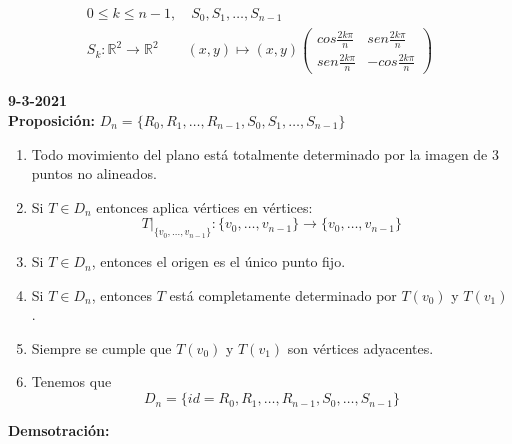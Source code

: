 \documentclass{article}
\begin{document}
\begin{gather*}
0\leq k \leq n-1, \quad S_0,S_1,\ldots,S_{n-1} \\
S_k:\mathbb{R}^2\rightarrow \mathbb{R}^2 \qquad (x,y)\mapsto (x,y)
\begin{pmatrix}
cos\frac{2k\pi}{n} & sen\frac{2k\pi}{n} \\
sen\frac{2k\pi}{n} & -cos\frac{2k\pi}{n}
\end{pmatrix}
\end{gather*}

\textbf{9-3-2021} \\

\textbf{Proposición:} \(D_n=\{R_0,R_1,\ldots,R_{n-1},S_0,S_1,\ldots,S_{n-1}\}\) 
\begin{enumerate}
\item Todo movimiento del plano está totalmente determinado por la imagen de 3 puntos no alineados.

\item Si $T\in D_n$ entonces aplica vértices en vértices:
\begin{equation*}
T|_{\{v_0,\ldots,v_{n-1}\}}:\{v_0,\ldots,v_{n-1}\}\longrightarrow \{v_0,\ldots,v_{n-1}\}
\end{equation*}

\item Si $T\in D_n$, entonces el origen es el único punto fijo.

\item Si $T\in D_n$, entonces $T$ está completamente determinado por $T(v_0)$ y $T(v_1)$.

\item Siempre se cumple que $T(v_0)$ y $T(v_1)$ son vértices adyacentes.

\item Tenemos que
\begin{equation*}
D_n=\{id=R_0,R_1,\ldots,R_{n-1},S_0,\ldots,S_{n-1}\}
\end{equation*}
\end{enumerate}

\textbf{Demsotración:}
\end{document}
